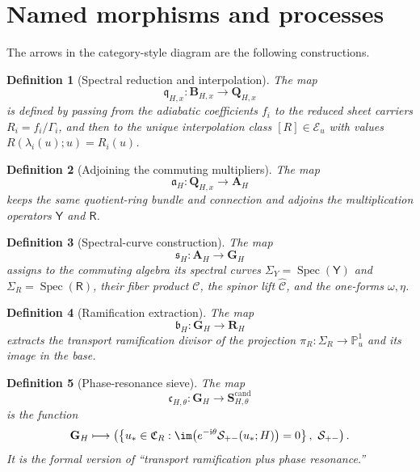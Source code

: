 \documentclass[11pt]{article}
\newcommand{\PP}{\mathbb P}
\newcommand{\ii}{\mathrm{i}}
\newcommand{\CY}{\Sigma_Y}
\newcommand{\CR}{\Sigma_R}
\newcommand{\Chat}{\widehat{\mathcal C}}
\newcommand{\Cu}{\mathcal C}
\newcommand{\Eu}{\mathcal E}
\newcommand{\Yop}{\mathsf Y}
\newcommand{\Rop}{\mathsf R}
\newcommand{\CRam}{\mathfrak C_R}
\newtheorem{definition}{Definition}[section]
\begin{document}
\section{Named morphisms and processes}

The arrows in the category-style diagram are the following constructions.

\begin{definition}[Spectral reduction and interpolation]
\label{def:q-map}
The map
\[
\mathfrak q_{H,x}:\mathbf B_{H,x}\longrightarrow \mathbf Q_{H,x}
\]
is defined by passing from the adiabatic coefficients $f_i$ to the reduced sheet carriers $R_i=f_i/\Gamma_i$, and then to the unique interpolation class $[R]\in\Eu_u$ with values $R(\lambda_i(u);u)=R_i(u)$.
\end{definition}

\begin{definition}[Adjoining the commuting multipliers]
\label{def:a-map}
The map
\[
\mathfrak a_H:\mathbf Q_{H,x}\longrightarrow \mathbf A_H
\]
keeps the same quotient-ring bundle and connection and adjoins the multiplication operators $\Yop$ and $\Rop$.
\end{definition}

\begin{definition}[Spectral-curve construction]
\label{def:s-map}
The map
\[
\mathfrak s_H:\mathbf A_H\longrightarrow \mathbf G_H
\]
assigns to the commuting algebra its spectral curves $\CY=\operatorname{Spec}(\Yop)$ and $\CR=\operatorname{Spec}(\Rop)$, their fiber product $\Cu$, the spinor lift $\Chat$, and the one-forms $\omega,\eta$.
\end{definition}

\begin{definition}[Ramification extraction]
\label{def:b-map}
The map
\[
\mathfrak b_H:\mathbf G_H\longrightarrow \mathbf R_H
\]
extracts the transport ramification divisor of the projection $\pi_R:\CR\to\PP^1_u$ and its image in the base.
\end{definition}

\begin{definition}[Phase-resonance sieve]
\label{def:c-map}
The map
\[
\mathfrak c_{H,\theta}:\mathbf G_H\longrightarrow \mathbf S^{\mathrm{cand}}_{H,\theta}
\]
is the function
\[
\mathbf G_H\longmapsto \left(\left\{u_*\in\CRam:\im\bigl(e^{-\ii\theta}\mathcal S_{+-}(u_*;H)\bigr)=0\right\},\ \mathcal S_{+-}\right).
\]
It is the formal version of ``transport ramification plus phase resonance.''
\end{definition}
\end{document}
